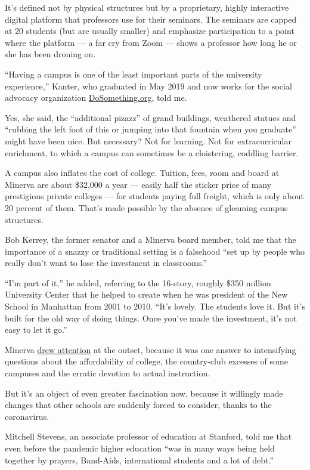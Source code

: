 It's defined not by physical structures but by a proprietary, highly
interactive digital platform that professors use for their seminars. The
seminars are capped at 20 students (but are usually smaller) and
emphasize participation to a point where the platform --- a far cry from
Zoom --- shows a professor how long he or she has been droning on.

``Having a campus is one of the least important parts of the university
experience,'' Kanter, who graduated in May 2019 and now works for the
social advocacy organization
\href{https://www.dosomething.org/us}{DoSomething.org}, told me.

Yes, she said, the ``additional pizazz'' of grand buildings, weathered
statues and ``rubbing the left foot of this or jumping into that
fountain when you graduate'' might have been nice. But necessary? Not
for learning. Not for extracurricular enrichment, to which a campus can
sometimes be a cloistering, coddling barrier.

A campus also inflates the cost of college. Tuition, fees, room and
board at Minerva are about \$32,000 a year --- easily half the sticker
price of many prestigious private colleges --- for students paying full
freight, which is only about 20 percent of them. That's made possible by
the absence of gleaming campus structures.

Bob Kerrey, the former senator and a Minerva board member, told me that
the importance of a snazzy or traditional setting is a falsehood ``set
up by people who really don't want to lose the investment in
classrooms.''

``I'm part of it,'' he added, referring to the 16-story, roughly \$350
million University Center that he helped to create when he was president
of the New School in Manhattan from 2001 to 2010. ``It's lovely. The
students love it. But it's built for the old way of doing things. Once
you've made the investment, it's not easy to let it go.''

Minerva
\href{https://www.theatlantic.com/magazine/archive/2014/09/the-future-of-college/375071/}{drew
attention} at the outset, because it was one answer to intensifying
questions about the affordability of college, the country-club excesses
of some campuses and the erratic devotion to actual instruction.

But it's an object of even greater fascination now, because it willingly
made changes that other schools are suddenly forced to consider, thanks
to the coronavirus.

Mitchell Stevens, an associate professor of education at Stanford, told
me that even before the pandemic higher education ``was in many ways
being held together by prayers, Band-Aids, international students and a
lot of debt.''

